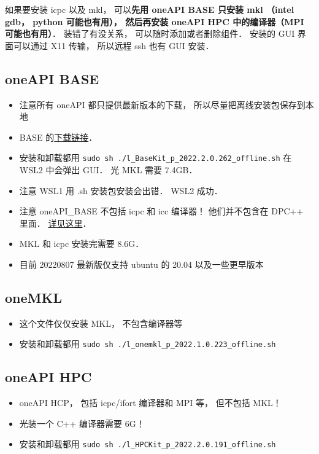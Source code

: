 

如果要安装 icpc 以及 mkl， 可以\textbf{先用 oneAPI BASE 只安装 mkl （intel gdb， python 可能也有用）， 然后再安装 oneAPI HPC 中的编译器（MPI 可能也有用）}．
装错了有没关系， 可以随时添加或者删除组件． 安装的 GUI 界面可以通过 X11 传输， 所以远程 ssh 也有 GUI 安装．

\subsection{oneAPI BASE}
\begin{itemize}
\item 注意所有 oneAPI 都只提供最新版本的下载， 所以尽量把离线安装包保存到本地
\item BASE 的\href{https://www.intel.com/content/www/us/en/developer/tools/oneapi/base-toolkit-download.html?operatingsystem=linux&distributions=webdownload&options=offline}{下载链接}．
\item 安装和卸载都用 \verb`sudo sh ./l_BaseKit_p_2022.2.0.262_offline.sh` 在 WSL2 中会弹出 GUI． 光 MKL 需要 7.4GB．
\item 注意 WSL1 用 .sh 安装包安装会出错． WSL2 成功．
\item 注意 oneAPI_BASE 不包括 icpc 和 icc 编译器！ 他们并不包含在 DPC++ 里面． \href{https://stackoverflow.com/questions/66527842/can-not-find-the-icc-compiler-after-having-installed-intel-oneapi-invoking-from}{详见这里}．
\item MKL 和 icpc 安装完需要 8.6G．
\item 目前 20220807 最新版仅支持 ubuntu 的 20.04 以及一些更早版本
\end{itemize}

\subsection{oneMKL}
\begin{itemize}
\item 这个文件仅仅安装 MKL， 不包含编译器等
\item 安装和卸载都用 \verb`sudo sh ./l_onemkl_p_2022.1.0.223_offline.sh`
\end{itemize}

\subsection{oneAPI HPC}
\begin{itemize}
\item oneAPI HCP， 包括 icpc/ifort 编译器和 MPI 等， 但不包括 MKL！
\item 光装一个 C++ 编译器需要 6G！
\item 安装和卸载都用 \verb`sudo sh ./l_HPCKit_p_2022.2.0.191_offline.sh`
\end{itemize}
